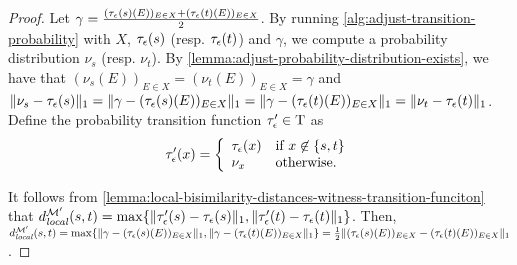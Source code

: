 \begin{proof}
Let $\gamma = \frac{(\tau_{\epsilon}(s)(E))_{E \in X} + (\tau_{\epsilon}(t)(E))_{E \in X}}{2}$. By running \cref{alg:adjust-transition-probability} with $X$, $\tau_{\epsilon}(s)$ (resp. $\tau_{\epsilon}(t)$) and $\gamma$, we compute a probability distribution $\nu_s$ (resp. $\nu_t$). By \cref{lemma:adjust-probability-distribution-exists}, we have that $(\nu_s(E))_{E \in X} = (\nu_t(E))_{E \in X}  = \gamma$ and $\|\nu_s - \tau_{\epsilon}(s)\|_1 = \|\gamma - (\tau_{\epsilon}(s)(E))_{E \in  X}\|_1 = \|\gamma - (\tau_{\epsilon}(t)(E))_{E \in  X}\|_1 = \|\nu_t - \tau_{\epsilon}(t)\|_1$. Define the probability transition function $\tau_{\epsilon}' \in {\rm T}$ as 	
\[
\tau_{\epsilon}'(x) = \left \{
\begin{array}{ll}
\tau_{\epsilon}(x)& \mbox{if $x \not\in \{s, t\}$}\\
\nu_x & \mbox{otherwise.}
\end{array}
\right .
\]

It follows from \cref{lemma:local-bisimilarity-distances-witness-transition-funciton} that $d_{\mathit{local}}^{\mathcal{M}'}(s, t) = \max\{\|\tau_{\epsilon}'(s) - \tau_{\epsilon}(s)\|_1, \|\tau_{\epsilon}'(t) - \tau_{\epsilon}(t)\|_1 \} $. Then, $d_{\mathit{local}}^{\mathcal{M}'}(s, t) = \max\{\|\gamma - (\tau_{\epsilon}(s)(E))_{E \in X}\|_1, \|\gamma - (\tau_{\epsilon}(t)(E))_{E \in X}\|_1\} = \frac{1}{2} \|(\tau_{\epsilon}(s)(E))_{E \in X} - (\tau_{\epsilon}(t)(E))_{E \in X}\|_1$.
\end{proof}

